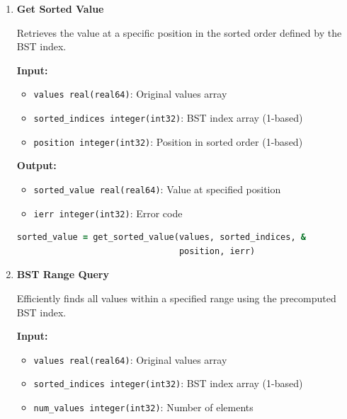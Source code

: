 \documentclass[11pt]{article}
\begin{document}
\begin{enumerate}
\begin{enumerate}
	      	\item \textbf{Get Sorted Value}
	      	      
	      	      Retrieves the value at a specific position in the sorted order defined
	      	      by the BST index.
	      	      
	      	      \textbf{Input:}
	      	      \begin{itemize}
	      	      	\item \texttt{values real(real64)}: Original values array
	      	      	      
	      	      	\item \texttt{sorted\_indices integer(int32)}: BST index array (1-based)
	      	      	      
	      	      	\item \texttt{position integer(int32)}: Position in sorted order (1-based)
	      	      \end{itemize}
	      	      \textbf{Output:}
	      	      \begin{itemize}
	      	      	\item \texttt{sorted\_value real(real64)}: Value at specified position
	      	      	      
	      	      	\item \texttt{ierr integer(int32)}: Error code
	      	      \end{itemize}
	      	      \begin{lstlisting}[language=Fortran]
sorted_value = get_sorted_value(values, sorted_indices, &
                                position, ierr)
	      	      \end{lstlisting}
	      	      
	      	\item \textbf{BST Range Query}
	      	      
	      	      Efficiently finds all values within a specified range using the precomputed
	      	      BST index.
	      	      
	      	      \textbf{Input:}
	      	      \begin{itemize}
	      	      	\item \texttt{values real(real64)}: Original values array
	      	      	      
	      	      	\item \texttt{sorted\_indices integer(int32)}: BST index array (1-based)
	      	      	      
	      	      	\item \texttt{num\_values integer(int32)}: Number of elements
	      	      	      

\end{itemize}
\end{enumerate}
\end{enumerate}
\end{document}
